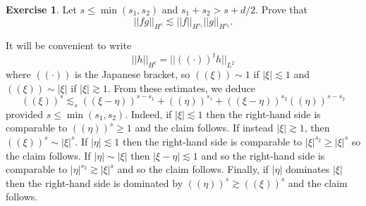 \documentclass[10pt]{article}
\theoremstyle{definition}
\newtheorem{exer}{Exercise}
\begin{document}
\begin{exer}
Let $s \leq \min(s_1, s_2)$ and $s_1 + s_2 > s + d/2$. Prove that
$$||fg||_{H^s} \lesssim ||f||_{H^{s_1}} ||g||_{H^{s_2}}.$$
\end{exer}

It will be convenient to write
$$||h||_{H^t} = ||((\cdot))^t h||_{L^2}$$
where $((\cdot))$ is the Japanese bracket, so $((\xi)) \sim 1$ if $|\xi| \lesssim 1$ and $((\xi)) \sim |\xi|$ if $|\xi| \gtrsim 1$.
From these estimates, we deduce
\begin{equation}
\label{Japanese}
((\xi))^s \lesssim_s ((\xi - \eta))^{s - s_1} + ((\eta))^{s_1} + ((\xi - \eta))^{s_2} ((\eta))^{s - s_2}
\end{equation}
provided $s \leq \min(s_1, s_2)$. Indeed, if $|\xi| \lesssim 1$ then the right-hand side is comparable to $((\eta))^s \geq 1$ and the claim follows.
If instead $|\xi| \gtrsim 1$, then $((\xi))^s \sim |\xi|^s$.
If $|\eta| \lesssim 1$ then the right-hand side is comparable to $|\xi|^{s_2} \geq |\xi|^s$ so the claim follows.
If $|\eta| \sim |\xi|$ then $|\xi - \eta| \lesssim 1$ and so the right-hand side is comparable to $|\eta|^{s_2} \gtrsim |\xi|^s$ and so the claim follows.
Finally, if $|\eta|$ dominates $|\xi|$ then the right-hand side is dominated by $((\eta))^s \gtrsim ((\xi))^s$ and the claim follows.
\end{document}
